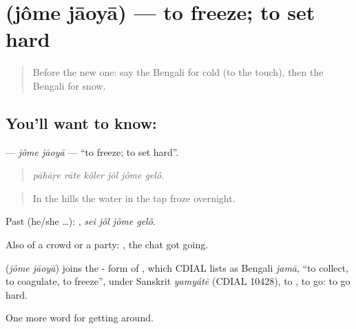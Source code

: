 \section[\texorpdfstring{\bn{জমে} \bn{যাওয়া} (jôme jāoyā)}{জমে যাওয়া (jôme jāoyā)}]{  (jôme jāoyā) — to freeze; to set hard}

\label{lesson:BN-C426-jome-jaoya}



\begin{quote}
Before the new one: say the Bengali for cold (to the touch), then the Bengali for snow.
\end{quote}

\subsection*{You'll want to know:  }
\textbf{ } — \emph{jôme jāoyā} — \textquotedblleft{}to freeze; to set hard\textquotedblright{}.

\begin{quote}
     
\end{quote}

\begin{quote}
\emph{pāhāṛe rāte kôler jôl jôme gelô.}
\end{quote}

\begin{quote}
In the hills the water in the tap froze overnight.
\end{quote}

Past (he/she …):    , \emph{sei jôl jôme gelô}.

Also of a crowd or a party:   , the chat got going.

\begin{cousinweb}
\textbf{ } (\emph{jôme jāoyā}) joins the - form of , which CDIAL lists as Bengali \emph{jamā}, \textquotedblleft{}to collect, to coagulate, to freeze\textquotedblright{}, under Sanskrit \emph{yamyátē} (CDIAL 10428), to , to go: to go hard.
\end{cousinweb}

\begin{grammarlens}[title={What you've built}]
One more word for getting around.
\end{grammarlens}

